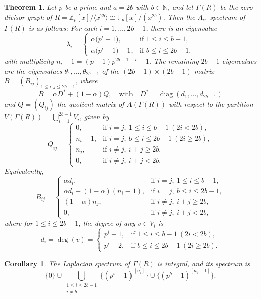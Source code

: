 \documentclass[10pt,a4paper]{amsart}
\newtheorem{theorem}{Theorem}
\newtheorem{corollary}{Corollary}
\begin{document}
\begin{theorem}\label{spectra thm even}
	Let $p$ be a prime and $a=2b$ with $b\in \mathbb{N}$, and let $ \varGamma(R)$ be the zero-divisor graph of $R = \mathbb{Z}_p[x]/\langle x^{2b}\rangle \cong \mathbb{F}_p[x]/(x^{2b})$. 	Then the $A_\alpha$--spectrum of $ \varGamma(R)$ is as follows: For each $i=1,\dots,2b-1$, there is an eigenvalue
		\[
		\lambda_i =
		\begin{cases}
			\alpha\bigl(p^{ i}-1\bigr), & \text{if } 1\le i \le b-1,\\[3pt]
			\alpha\bigl(p^{ i}-1\bigr) - 1, & \text{if } b\le i \le 2b-1,
		\end{cases}
		\]
		with multiplicity $n_i - 1 = (p-1)p^{ 2b-1-i} - 1$. The remaining $2b-1$ eigenvalues are the eigenvalues
		$\theta_1,\dots,\theta_{2b-1}$ of the $(2b-1)\times(2b-1)$ matrix
		$B=(B_{ij})_{1\le i,j\le 2b-1}$, where
		\[
		B = \alpha D^\ast + (1-\alpha)Q,\quad \text{with}\quad
		D^\ast = \operatorname{diag}(d_1,\dots,d_{2b-1})
		\]
		and $Q=(Q_{ij})$ the quotient matrix of $A( \varGamma(R))$
		with respect to the partition $V( \varGamma(R))=\bigcup_{i=1}^{2b-1}V_i$, given by
		\[
		Q_{ij} =
		\begin{cases}
			0, & \text{if } i=j,\ 1\le i\le b-1\ (2i<2b),\\[3pt]
			n_i - 1, & \text{if } i=j,\ b\le i\le 2b-1\ (2i\ge 2b),\\[3pt]
			n_j, & \text{if } i\ne j,\ i+j\ge 2b,\\[3pt]
			0, & \text{if } i\ne j,\ i+j<2b.
		\end{cases}
		\]
		Equivalently,
		\[
		B_{ij} =
		\begin{cases}
			\alpha d_i, & \text{if } i=j,\ 1\le i\le b-1,\\[3pt]
			\alpha d_i + (1-\alpha)(n_i-1), & \text{if } i=j,\ b\le i\le 2b-1,\\[3pt]
			(1-\alpha)n_j, & \text{if } i\ne j,\ i+j\ge 2b,\\[3pt]
			0, & \text{if } i\ne j,\ i+j<2b,
		\end{cases}
		\]
		where for $1\le i\le 2b-1$, the degree of any $v\in V_i$ is
		\[
		d_i = \deg(v) =
		\begin{cases}
			p^{ i} - 1, & \text{if } 1\le i \le b-1 \ (2i<2b),\\[3pt]
			p^{ i} - 2, & \text{if } b\le i \le 2b-1 \ (2i\ge 2b).
		\end{cases}
		\]
\end{theorem}

\begin{corollary}\label{L integral even}
	The Laplacian spectrum of $ \varGamma(R)$ is integral, and its spectrum is 
	\[ \{0\}
	\cup
	\bigcup_{\substack{1\le i\le 2b-1\\ i\neq b}}
	\bigl\{(p^{ i}-1)^{[n_i]}\bigr\}
	\cup
	\bigl\{(p^{ b}-1)^{[n_b-1]}\bigr\}. \]
\end{corollary}
\end{document}
